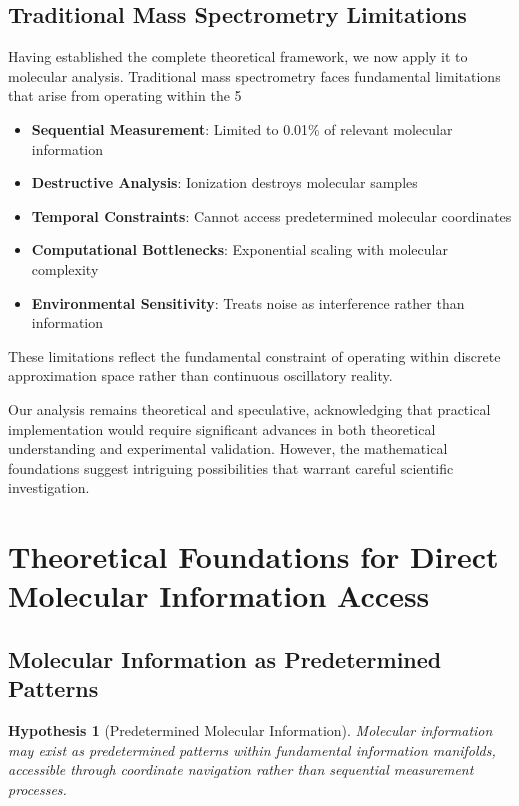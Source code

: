 \documentclass[11pt,a4paper]{article}
\newtheorem{hypothesis}[theorem]{Hypothesis}
\theoremstyle{remark}
\begin{document}
\subsection{Traditional Mass Spectrometry Limitations}

Having established the complete theoretical framework, we now apply it to molecular analysis. Traditional mass spectrometry faces fundamental limitations that arise from operating within the 5%

\begin{itemize}
\item \textbf{Sequential Measurement}: Limited to 0.01\% of relevant molecular information
\item \textbf{Destructive Analysis}: Ionization destroys molecular samples
\item \textbf{Temporal Constraints}: Cannot access predetermined molecular coordinates
\item \textbf{Computational Bottlenecks}: Exponential scaling with molecular complexity
\item \textbf{Environmental Sensitivity}: Treats noise as interference rather than information
\end{itemize}

These limitations reflect the fundamental constraint of operating within discrete approximation space rather than continuous oscillatory reality.

Our analysis remains theoretical and speculative, acknowledging that practical implementation would require significant advances in both theoretical understanding and experimental validation. However, the mathematical foundations suggest intriguing possibilities that warrant careful scientific investigation.

\section{Theoretical Foundations for Direct Molecular Information Access}

\subsection{Molecular Information as Predetermined Patterns}

\begin{hypothesis}[Predetermined Molecular Information]
Molecular information may exist as predetermined patterns within fundamental information manifolds, accessible through coordinate navigation rather than sequential measurement processes.
\end{hypothesis}
\end{document}

